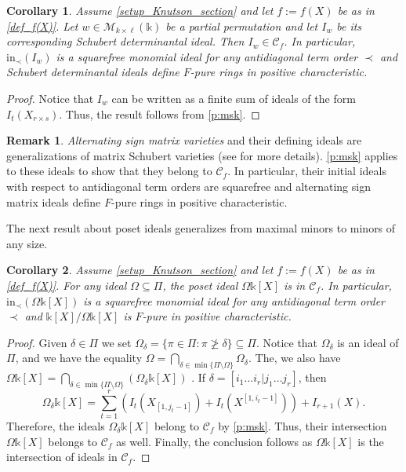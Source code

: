 \documentclass[12pt]{amsart}
\renewcommand{\leq}{\leqslant}
\renewcommand{\geq}{\geqslant}
\newtheorem{corollary}[corollary]{Corollary}
\theoremstyle{definition}
\newtheorem{remark}[remark]{Remark}
\renewcommand{\(}{\left(}
\renewcommand{\)}{\right)}
\newcommand{\kk}{\mathbb{k}}
\renewcommand{\!}[1]{{\color{red}\text{\Huge$\star$ }#1}}
\newcommand{\C}{\mathcal{C}}
\newcommand{\init}{\mathrm{in}}
\begin{document}
\begin{corollary}\label{c:msk}
Assume \autoref{setup_Knutson_section} and  let $f:=f(X) $ be as in \autoref{def_f(X)}. Let $w \in \mathscr{M}_{k\times \ell}(\mathbb{\kk})$ be a partial  permutation and let $I_{w}$ be its corresponding Schubert determinantal ideal. Then $I_{w} \in \mathcal{C}_f$. In particular,  
$\init_\prec(I_{w})$ is a squarefree monomial ideal for any antidiagonal term order $\prec$ and 
Schubert determinantal  ideals define $F$-pure rings in positive characteristic.
\end{corollary}

\begin{proof}
Notice that $I_{w}$ can be written as a finite sum of ideals of the form $I_t(X_{r\times s})$. Thus, %
the result follows from  \autoref{p:msk}. %
\end{proof}

\begin{remark}
{\it Alternating sign matrix varieties}  and their defining ideals are generalizations of matrix Schubert varieties (see  \cite{klein2021bumpless} for more details).  \autoref{p:msk} applies to these ideals to show that  they belong to  $\mathcal{C}_f$. In particular, their initial ideals with respect to  antidiagonal term orders are squarefree and alternating sign matrix ideals define $F$-pure rings in positive characteristic.
\end{remark}

The next result about poset ideals generalizes \cite[Remark 79]{BSV} from maximal minors to minors of any size.

\begin{corollary}\label{c:pif}
Assume \autoref{setup_Knutson_section} and  let $f:=f(X) $ be as in \autoref{def_f(X)}. For any  ideal $\Omega\subseteq \Pi$, the poset ideal $\Omega\kk[X]$  is in $\C_{f}$. In particular, $\init_\prec(\Omega \kk[X])$ is a squarefree monomial ideal for any antidiagonal term order $\prec$ and $\kk[X]/\Omega \kk[X]$ is $F$-pure  in positive characteristic.
\end{corollary}
\begin{proof}
Given $\delta\in\Pi$ we set $\Omega_{\delta}=\{\pi\in\Pi:\pi\not\geq \delta\}\subseteq \Pi$. Notice that $\Omega_{\delta}$ is an ideal of $\Pi$, and we have the equality
$\Omega=\bigcap_{\delta\in\min\{\Pi\setminus \Omega\}}\Omega_{\delta}.$ 
The, we also have 
$\Omega \kk[X]=\bigcap_{\delta\in\min\{\Pi\setminus \Omega\}}(\Omega_{\delta}\kk[X])$ \cite[Proposition 5.2]{BookDet}. 
If $\delta=[i_1\ldots i_r|j_1\ldots j_r]$, then
\[\Omega_{\delta}\kk[X]=\sum_{t=1}^r\left(I_t\left(X_{[1,j_t-1]}\right)+I_t\left(X^{[1,i_t-1]}\right)\right)+I_{r+1}(X).\]
Therefore, the ideals $\Omega_{\delta}\kk[X]$ belong to $\C_f$ by  \autoref{p:msk}. Thus, their intersection $\Omega \kk[X]$ belongs to $\C_f$ as well. Finally, the conclusion follows as  $\Omega \kk[X]$ is the intersection of ideals in $\C_f$.
\end{proof}
\end{document}
